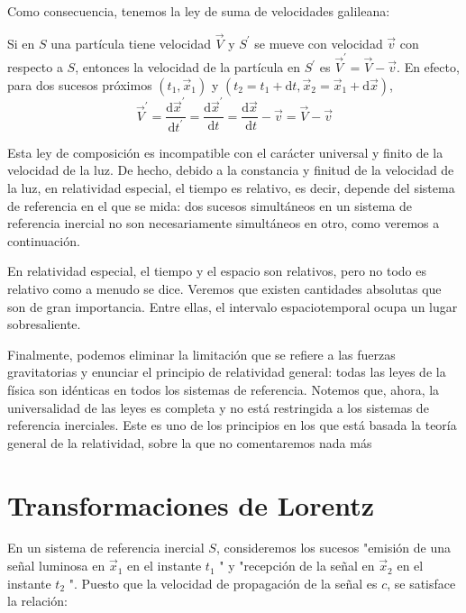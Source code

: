   Como consecuencia, tenemos la ley de suma de velocidades galileana:
  \begin{definition}

    Si en $S$ una partícula tiene velocidad $\vec{V}$ y $S^{\prime}$ se mueve con velocidad $\vec{v}$ con respecto a $S$, entonces la velocidad de la partícula en $S^{\prime}$ es $\vec{V}^{\prime}=\vec{V}-\vec{v}$. En efecto, para dos sucesos próximos $\left(t_{1}, \vec{x}_{1}\right)$ y $\left(t_{2}=t_{1}+\mathrm{d} t, \vec{x}_{2}=\vec{x}_{1}+\mathrm{d} \vec{x}\right)$,
    \[\vec{V}^{\prime}=\frac{\mathrm{d} \vec{x}^{\prime}}{\mathrm{d} t^{\prime}}=\frac{\mathrm{d} \vec{x}^{\prime}}{\mathrm{d} t}=\frac{\mathrm{d} \vec{x}}{\mathrm{~d} t}-\vec{v}=\vec{V}-\vec{v}\]
    
    
    Esta ley de composición es incompatible con el carácter universal y finito de la velocidad de la luz. De hecho, debido a la constancia y finitud de la velocidad de la luz, en relatividad especial, el tiempo es relativo, es decir, depende del sistema de referencia en el que se mida: dos sucesos simultáneos en un sistema de referencia inercial no son necesariamente simultáneos en otro, como veremos a continuación.

  En relatividad especial, el tiempo y el espacio son relativos, pero no todo es relativo como a menudo se dice. Veremos que existen cantidades absolutas que son de gran importancia. Entre ellas, el intervalo espaciotemporal ocupa un lugar sobresaliente.

  Finalmente, podemos eliminar la limitación que se refiere a las fuerzas gravitatorias y enunciar el principio de relatividad general: todas las leyes de la física son idénticas en todos los sistemas de referencia. Notemos que, ahora, la universalidad de las leyes es completa y no está restringida a los sistemas de referencia inerciales. Este es uno de los principios en los que está basada la teoría general de la relatividad, sobre la que no comentaremos nada más
  \end{definition}
\section{Transformaciones de Lorentz}

En un sistema de referencia inercial $S$, consideremos los sucesos "emisión de una señal luminosa en $\vec{x}_{1}$ en el instante $t_{1}$ " y "recepción de la señal en $\vec{x}_{2}$ en el instante $t_{2}$ ". Puesto que la velocidad de propagación de la señal es $c$, se satisface la relación:

